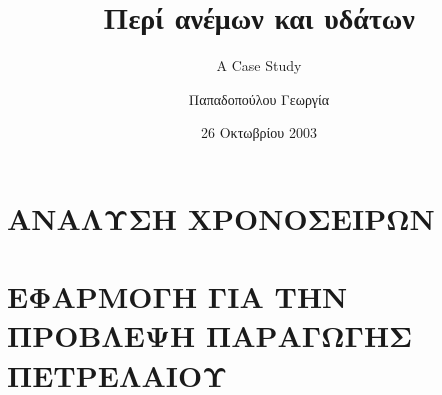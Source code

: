 \documentclass[twoside,a4paper]{book}
\author{Παπαδοπούλου Γεωργία}
\title{Περί ανέμων και υδάτων}
\subtitle{A Case Study}
\date{26 Οκτωβρίου 2003}
\begin{document}



\tableofcontents



\cleardoublepage


\part{ΑΝΑΛΥΣΗ ΧΡΟΝΟΣΕΙΡΩΝ}





\part{ΕΦΑΡΜΟΓΗ ΓΙΑ ΤΗΝ ΠΡΟΒΛΕΨΗ ΠΑΡΑΓΩΓΗΣ ΠΕΤΡΕΛΑΙΟΥ}





\appendix




\backmatter

\printindex

\clearpage


\end{document}

